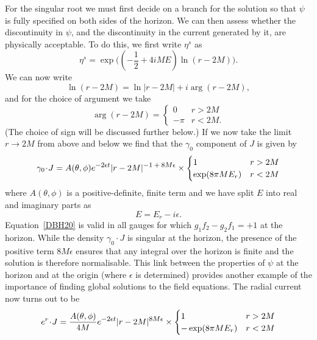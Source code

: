 \documentclass[a4paper]{article}
\numberwithin{equation}{section}
\newcommand{\et}[1]{e^{\mbox{\footnotesize $#1$}}}
\newcommand{\dt}{\! \cdot \!}
\newcommand{\half}{{\textstyle \frac{1}{2}}}
\newcommand{\eps}{\epsilon}
\newcommand{\go}{\gamma_{0}}
\begin{document}
For the singular root we must first decide on a branch for the
solution so that $\psi$ is fully specified on both sides of the
horizon.  We can then assess whether the discontinuity in $\psi$, and
the discontinuity in the current generated by it, are physically
acceptable.  To do this, we first write $\eta^s$ as
%
\begin{equation}
\eta^s = \exp \bigl( (-\half + 4iME) \ln(r-2M) \bigr).
\end{equation}
%
We can now write
%
\begin{equation}
\ln(r-2M) = \ln|r-2M| + i \arg(r-2M),
\end{equation}
%
and for the choice of argument we take
%
\begin{equation}
\arg(r-2M) =
\begin{cases}
0 & r> 2M \\
-\pi & r < 2M.
\label{DBH12a}
\end{cases}
\end{equation}
%
(The choice of sign will be discussed further below.)  If we now take
the limit $r\rightarrow 2M$ from above and below we find that the
$\go$ component of $J$ is given by
%
\begin{equation}
\go \dt J = A(\theta,\phi) \et{-2\eps t} |r-2M|^{\mbox{\footnotesize
$-1 + 8M\eps$}} \times 
\begin{cases}
1 & r > 2M \\
\exp (8 \pi M E_r) & r < 2M
\end{cases}
\label{DBH20}
\end{equation}
%
where $A(\theta,\phi)$ is a positive-definite, finite term and we have
split $E$ into real and imaginary parts as
%
\begin{equation}
E = E_r - i \eps.
\end{equation} 
%
Equation~\eqref{DBH20} is valid in all gauges for which $g_1 f_2-g_2
f_1=+1$ at the horizon.  While the density $\go\dt J$ is singular
at the horizon, the presence of the positive term $8M\eps$ ensures
that any integral over the horizon is finite and the solution is
therefore normalisable.  This link between the properties of $\psi$ at
the horizon and at the origin (where $\eps$ is determined) provides
another example of the importance of finding global solutions to the
field equations.  The radial current now turns out to be
%
\begin{equation}
e^r \dt J = \frac{A(\theta,\phi)}{4M} \et{-2\eps t}
|r-2M|^{\mbox{\footnotesize $8M\eps$}} \times  
\begin{cases}
1 & r > 2M \\
-\exp(8 \pi M E_r) & r < 2M
\end{cases}
\label{DBH21}
\end{equation}
\end{document}
